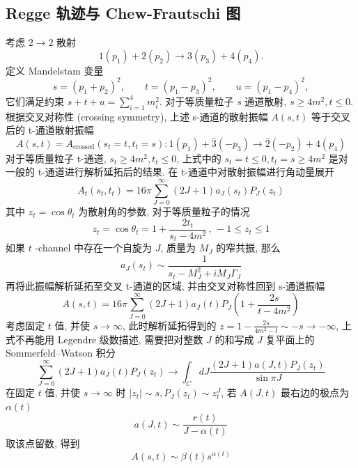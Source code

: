 \documentclass[10pt]{article}
\newcounter{ex}[section]\setcounter{ex}{0}
\numberwithin{equation}{section}
\begin{document}
\subsection{Regge 轨迹与 Chew-Frautschi 图}
考虑 $2\to2$ 散射
\begin{equation}  
1(p_{1})+2(p_{2})\longrightarrow 3(p_{3})+4(p_{4}).  
\end{equation}
定义 Mandelstam 变量
\begin{equation}  
s=(p_1+p_2)^2,\qquad t=(p_1-p_3)^2,\qquad u=(p_1-p_4)^2,  
\end{equation}
它们满足约束 $s+t+u=\sum_{i=1}^{4}m_i^2$. 对于等质量粒子 $s$ 通道散射, $s\geq 4m^2,t\leq 0$. 根据交叉对称性 (crossing symmetry), 上述 s-通道的散射振幅 $A(s,t)$ 等于交叉后的 t-通道散射振幅
\begin{equation}
A(s,t)=A_{\text{crossed}}(s_{t}=t,t_{t}=s):1(p_{1})+\bar 3(-p_{3})\longrightarrow \bar 2(-p_{2})+4(p_{4})
\end{equation}
对于等质量粒子 t-通道, $s_{t}\geq 4m^2,t_{t}\leq 0$, 上式中的 $s_{t}=t\leq 0,t_{t}=s\geq 4m^2$ 是对一般的 t-通道进行解析延拓后的结果. 
在 t-通道中对散射振幅进行角动量展开
\begin{equation}
A_{t}(s_{t},t_{t})=16\pi \sum_{J=0}^\infty(2J+1)a_{J}(s_{t})P_{J}(z_{t})
\end{equation}
其中 $z_{t}=\cos\theta_{t}$ 为散射角的参数, 对于等质量粒子的情况
\begin{equation}
z_{t}=\cos\theta_{t}=1+\frac{2t_{t}}{s_{t}-4m^2} \, , \, -1\leq z_{t}\leq 1
\end{equation}
如果 $t$ -channel 中存在一个自旋为 $J$, 质量为 $M_J$ 的窄共振, 那么
\begin{equation}
a_{J}(s_{t})\sim \frac{1}{s_{t}-M_{J}^2+iM_{J}\Gamma_{J}}
\end{equation}
再将此振幅解析延拓至交叉 t-通道的区域, 并由交叉对称性回到 s-通道振幅
\begin{equation}
A(s,t)=16\pi \sum_{J=0}^\infty(2J+1)a_{J}(t)P_{J}\left( 1+\frac{2s}{t-4m^2} \right)
\end{equation}
考虑固定 $t$ 值, 并使 $s\to \infty$, 此时解析延拓得到的 $z=1-\frac{2s}{4m^2-t}\sim -s\to-\infty$, 上式不再能用 Legendre 级数描述, 需要把对整数 $J$ 的和写成 $J$ 复平面上的 Sommerfeld–Watson 积分\cite{Regge1959,CappelliEtAl2012}
\begin{equation}
\sum_{J=0}^\infty (2J+1)a_{J}(t)P_{J}(z_{t})\longrightarrow\int_{C}dJ \frac{(2J+1)a(J,t)P_{J}(z_{t})}{\sin \pi J}
\end{equation}
在固定 $t$ 值, 并使 $s\to \infty$ 时 $|z_{t}|\sim s,P_{J}(z_{t})\sim z_{t}^J$, 若 $A(J,t)$ 最右边的极点为 $\alpha(t)$
\begin{equation}
a(J,t)\sim \frac{r(t)}{J-\alpha(t)}
\end{equation}
取该点留数, 得到
\begin{equation}\label{Regge}
A(s,t)\sim \beta(t)s^{\alpha(t)}
\end{equation}
\end{document}
